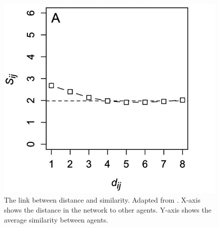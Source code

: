 \documentclass{article}
\begin{document}
\begin{figure}[H]
    \centering
    \includegraphics[width=.8\linewidth]{../plots/references/kossinets_watts_distance.jpeg}
  \caption{The link between distance and similarity. Adapted from \protect\citeauthor{kossinets_origins_2009} \protect\citeyear{kossinets_origins_2009}. X-axis shows the distance in the network to other agents. Y-axis shows the average similarity between agents.}
  \label{fig:distance_similarity}
\end{figure}
\end{document}
